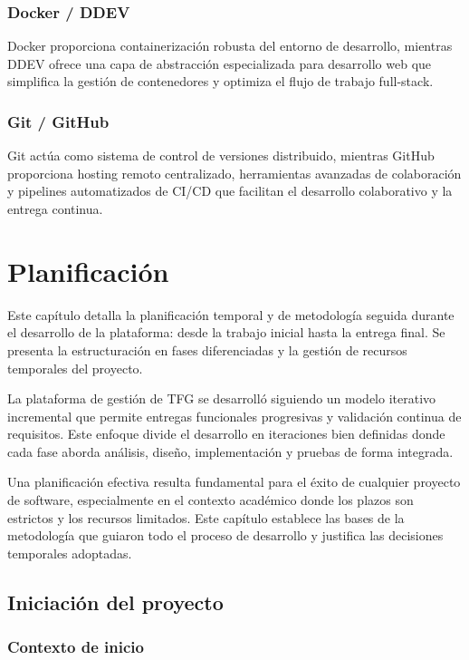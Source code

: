 \documentclass[12pt,a4paper,oneside]{report}
\begin{document}
\subsection{Docker / DDEV}\label{docker-ddev}

Docker proporciona containerización robusta del entorno de desarrollo, mientras DDEV ofrece una capa de abstracción especializada para desarrollo web que simplifica la gestión de contenedores y optimiza el flujo de trabajo full-stack.

\subsection{Git / GitHub}\label{git-github}

Git actúa como sistema de control de versiones distribuido, mientras GitHub proporciona hosting remoto centralizado, herramientas avanzadas de colaboración y pipelines automatizados de CI/CD que facilitan el desarrollo colaborativo y la entrega continua.

\chapter{Planificación}\label{planificaciuxf3n}
Este capítulo detalla la planificación temporal y de metodología seguida durante el desarrollo de la plataforma: desde la trabajo inicial hasta la entrega final. Se presenta la estructuración en fases diferenciadas y la gestión de recursos temporales del proyecto.

La plataforma de gestión de TFG se desarrolló siguiendo un modelo iterativo incremental que permite entregas funcionales progresivas y validación continua de requisitos. Este enfoque divide el desarrollo en iteraciones bien definidas donde cada fase aborda análisis, diseño, implementación y pruebas de forma integrada.

Una planificación efectiva resulta fundamental para el éxito de cualquier proyecto de software, especialmente en el contexto académico donde los plazos son estrictos y los recursos limitados. Este capítulo establece las bases de la metodología que guiaron todo el proceso de desarrollo y justifica las decisiones temporales adoptadas.

\section{Iniciación del proyecto}\label{iniciaciuxf3n-del-proyecto}

\subsection{Contexto de inicio}\label{contexto-de-inicio}
\end{document}
